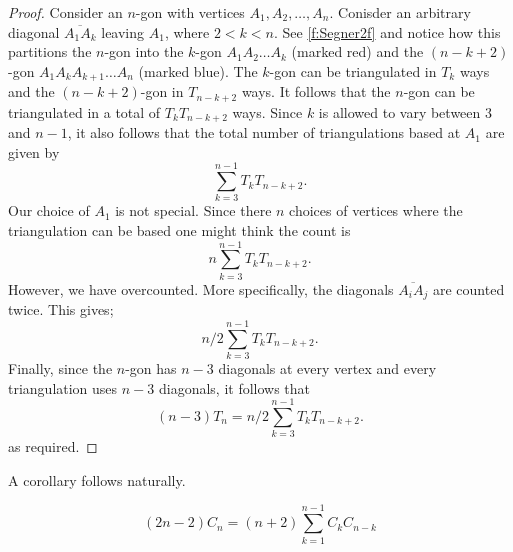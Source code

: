 \begin{proof}
Consider an $n$-gon with vertices $A_1,A_2,\ldots,A_n$. Conisder an arbitrary diagonal $\overline{A_1A_k}$ leaving $A_1$, where $2<k<n$. See \cref{f:Segner2f} and notice how this partitions the $n$-gon into the $k$-gon $A_1A_2\ldots A_k$ (marked red) and the $(n-k+2)$-gon $A_1A_kA_{k+1}\ldots A_n$ (marked blue). The $k$-gon can be triangulated in $T_k$ ways and the $(n-k+2)$-gon in $T_{n-k+2}$ ways. It follows that the $n$-gon can be triangulated in a total of $T_kT_{n-k+2}$ ways. Since $k$ is allowed to vary between $3$ and $n-1$, it also follows that the total number of triangulations based at $A_1$ are given by \[
\sum_{k=3}^{n-1}T_kT_{n-k+2}.
\]
Our choice of $A_1$ is not special. Since there $n$ choices of vertices where the triangulation can be based one might think the count is
\[
n\sum_{k=3}^{n-1}T_kT_{n-k+2}.
\]
However, we have overcounted. More specifically, the diagonals $\overline{A_iA_j}$ are counted twice. This gives;
\[
n/2\sum_{k=3}^{n-1}T_kT_{n-k+2}.
\]
Finally, since the $n$-gon has $n-3$ diagonals at every vertex and every triangulation uses $n-3$ diagonals, it follows that
\[
(n-3)T_n = n/2\sum_{k=3}^{n-1}T_kT_{n-k+2}.
\]
as required.
\end{proof}
A corollary follows naturally.
\begin{corollary}
\[
(2n-2)C_n = (n+2)\sum_{k=1}^{n-1}C_kC_{n-k}
\]
\end{corollary}